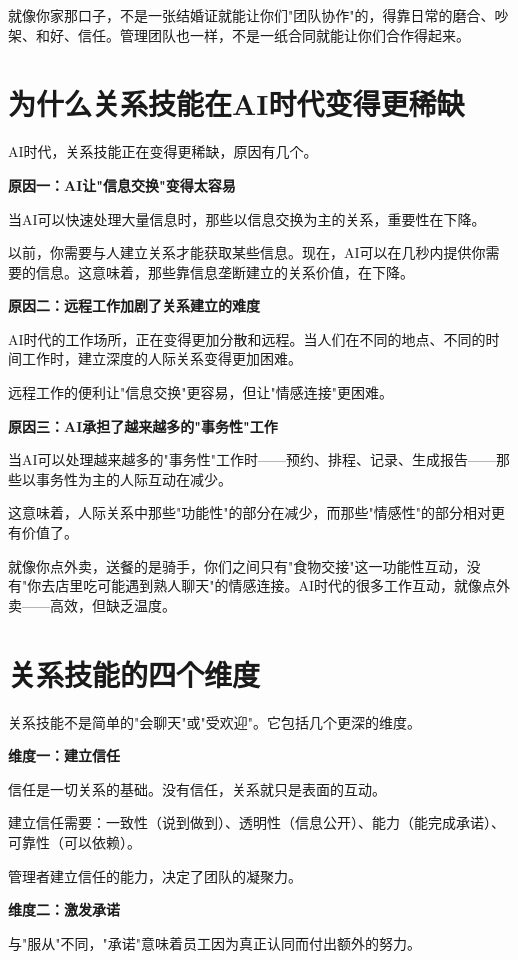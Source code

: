 就像你家那口子，不是一张结婚证就能让你们"团队协作"的，得靠日常的磨合、吵架、和好、信任。管理团队也一样，不是一纸合同就能让你们合作得起来。

\section{为什么关系技能在AI时代变得更稀缺}


AI时代，关系技能正在变得更稀缺，原因有几个。

\textbf{原因一：AI让"信息交换"变得太容易}

当AI可以快速处理大量信息时，那些以信息交换为主的关系，重要性在下降。

以前，你需要与人建立关系才能获取某些信息。现在，AI可以在几秒内提供你需要的信息。这意味着，那些靠信息垄断建立的关系价值，在下降。

\textbf{原因二：远程工作加剧了关系建立的难度}

AI时代的工作场所，正在变得更加分散和远程。当人们在不同的地点、不同的时间工作时，建立深度的人际关系变得更加困难。

远程工作的便利让"信息交换"更容易，但让"情感连接"更困难。

\textbf{原因三：AI承担了越来越多的"事务性"工作}

当AI可以处理越来越多的"事务性"工作时——预约、排程、记录、生成报告——那些以事务性为主的人际互动在减少。

这意味着，人际关系中那些"功能性"的部分在减少，而那些"情感性"的部分相对更有价值了。

就像你点外卖，送餐的是骑手，你们之间只有"食物交接"这一功能性互动，没有"你去店里吃可能遇到熟人聊天"的情感连接。AI时代的很多工作互动，就像点外卖——高效，但缺乏温度。

\section{关系技能的四个维度}


关系技能不是简单的"会聊天"或"受欢迎"。它包括几个更深的维度。

\textbf{维度一：建立信任}

信任是一切关系的基础。没有信任，关系就只是表面的互动。

建立信任需要：一致性（说到做到）、透明性（信息公开）、能力（能完成承诺）、可靠性（可以依赖）。

管理者建立信任的能力，决定了团队的凝聚力。

\textbf{维度二：激发承诺}

与"服从"不同，"承诺"意味着员工因为真正认同而付出额外的努力。

